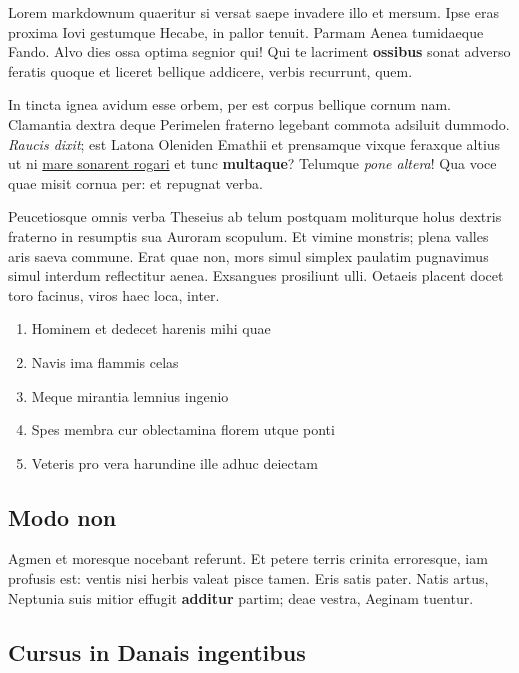 \documentclass[
a5paper,BCOR=0mm,DIV=13,headinclude=yes,footinclude=no,twoside=semi,open=right,fontsize=9.5pt]{scrartcl}
\providecommand{\tightlist}{%
  \setlength{\itemsep}{0pt}\setlength{\parskip}{0pt}}
\begin{document}
Lorem markdownum quaeritur si versat saepe invadere illo et mersum. Ipse
eras proxima Iovi gestumque Hecabe, in pallor tenuit. Parmam Aenea
tumidaeque Fando. Alvo dies ossa optima segnior qui! Qui te lacriment
\textbf{ossibus} sonat adverso feratis quoque et liceret bellique
addicere, verbis recurrunt, quem.

In tincta ignea avidum esse orbem, per est corpus bellique cornum nam.
Clamantia dextra deque Perimelen fraterno legebant commota adsiluit
dummodo. \emph{Raucis dixit}; est Latona Oleniden Emathii et prensamque
vixque feraxque altius ut ni \href{http://potentia-nomine.io/}{mare
sonarent rogari} et tunc \textbf{multaque}? Telumque \emph{pone altera}!
Qua voce quae misit cornua per: et repugnat verba.

Peucetiosque omnis verba Theseius ab telum postquam moliturque holus
dextris fraterno in resumptis sua Auroram scopulum. Et vimine monstris;
plena valles aris saeva commune. Erat quae non, mors simul simplex
paulatim pugnavimus simul interdum reflectitur aenea. Exsangues
prosiliunt ulli. Oetaeis placent docet toro facinus, viros haec loca,
inter.

\begin{enumerate}
\def\labelenumi{\arabic{enumi}.}
\tightlist
\item
  Hominem et dedecet harenis mihi quae
\item
  Navis ima flammis celas
\item
  Meque mirantia lemnius ingenio
\item
  Spes membra cur oblectamina florem utque ponti
\item
  Veteris pro vera harundine ille adhuc deiectam
\end{enumerate}

\subsection{Modo non}\label{modo-non}

Agmen et moresque nocebant referunt. Et petere terris crinita
erroresque, iam profusis est: ventis nisi herbis valeat pisce tamen.
Eris satis pater. Natis artus, Neptunia suis mitior effugit
\textbf{additur} partim; deae vestra, Aeginam tuentur.

\subsection{Cursus in Danais
ingentibus}\label{cursus-in-danais-ingentibus}
\end{document}
